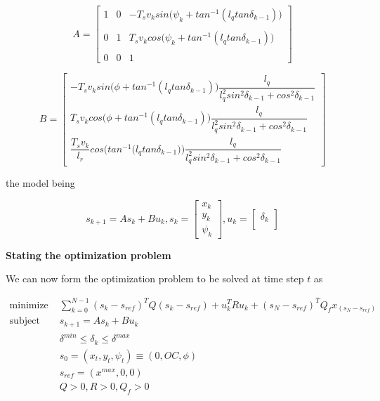 \begin{equation}
  A =
  \begin{bmatrix}
    1 & 0 & -T_s v_k sin\Big(\psi_k + tan^{-1} (l_q tan\delta_{k-1})\Big) \\\\
    0 & 1 & T_s v_k cos\Big(\psi_k + tan^{-1} (l_q tan\delta_{k-1})\Big) \\\\
    0 & 0 & 1
  \end{bmatrix}
\end{equation}

\begin{equation}
  B =
  \begin{bmatrix}
    -T_s v_k sin\Big(\phi + tan^{-1} (l_q tan\delta_{k-1})\Big) \dfrac{l_q}{l_q^2 sin^2\delta_{k-1} + cos^2\delta_{k-1}} \\
    T_s v_k cos\Big(\phi + tan^{-1} (l_q tan\delta_{k-1})\Big) \dfrac{l_q}{l_q^2 sin^2\delta_{k-1} + cos^2\delta_{k-1}} \\
    \dfrac{T_s v_k}{l_r} cos\Bigg(tan^{-1} \Big(l_q tan\delta_{k-1}\Big)\Bigg) \dfrac{l_q}{l_q^2 sin^2\delta_{k-1} + cos^2\delta_{k-1}}
  \end{bmatrix}
\end{equation}

the model being

\begin{equation}
  s_{k+1} = A s_k + B u_k,
  s_k=
  \begin{bmatrix}
    x_{k} \\
    y_{k} \\
    \psi_{k}
  \end{bmatrix},
  u_k=
  \begin{bmatrix}
    \delta_{k}\\
  \end{bmatrix}
\end{equation}



\textbf{Stating the optimization problem}

We can now form the optimization problem to be solved at time step $t$ as

\begin{align}
  \text{minimize }    & \sum\limits_{k=0}^{N-1} (s_k - s_{ref})^T Q (s_k - s_{ref}) + u_k^T R u_k + (s_N-s_{ref})^T Q_f x_(s_N-s_{ref}) \\
  \text{subject to }  & s_{k+1} = A s_k + B u_k \\
                      & \delta^{min} \leq \delta_k \leq \delta^{max} \\
                      & s_0 = (x_t, y_t, \psi_t) \equiv (0, OC, \phi)\\
                      & s_{ref} = (x^{max}, 0, 0)\\
                      & Q > 0, R > 0, Q_f > 0
\end{align}
